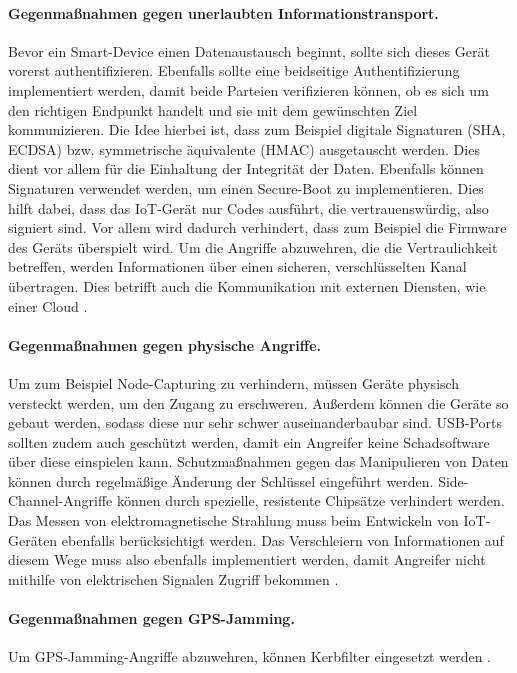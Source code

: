\paragraph{Gegenmaßnahmen gegen unerlaubten Informationstransport.}
Bevor ein Smart-De\-vice einen Datenaustausch beginnt, sollte sich dieses Gerät
vorerst authentifizieren. Ebenfalls sollte eine beidseitige Authentifizierung
implementiert werden, damit beide Parteien verifizieren können, ob es sich um
den richtigen Endpunkt handelt und sie mit dem gewünschten Ziel kommunizieren.
Die Idee hierbei ist, dass zum Beispiel digitale Signaturen (SHA, ECDSA) bzw.
symmetrische äquivalente (HMAC) ausgetauscht werden. Dies dient vor allem für
die Einhaltung der Integrität der Daten. Ebenfalls können Signaturen verwendet
werden, um einen Secure-Boot zu implementieren. Dies hilft dabei, dass das
IoT-Gerät nur Codes ausführt, die vertrauenswürdig, also signiert sind. Vor
allem wird dadurch verhindert, dass zum Beispiel die Firmware des Geräts
überspielt wird. Um die Angriffe abzuwehren, die die Vertraulichkeit betreffen,
werden Informationen über einen sicheren, verschlüsselten Kanal übertragen. Dies
betrifft auch die Kommunikation mit externen Diensten, wie einer Cloud
\cite{paper}.

\paragraph{Gegenmaßnahmen gegen physische Angriffe.}
Um zum Beispiel Node-Capturing zu verhindern, müssen Geräte physisch versteckt
werden, um den Zugang zu erschweren. Außerdem können die Geräte so gebaut
werden, sodass diese nur sehr schwer auseinanderbaubar sind. USB-Ports sollten
zudem auch geschützt werden, damit ein Angreifer keine Schadsoftware über diese
einspielen kann. Schutzmaßnahmen gegen das Manipulieren von Daten können durch
regelmäßige Änderung der Schlüssel eingeführt werden. Side-Channel-Angriffe
können durch spezielle, resistente Chipsätze verhindert werden.  Das Messen von
elektromagnetische Strahlung muss beim Entwickeln von IoT-Geräten ebenfalls
berücksichtigt werden. Das Verschleiern von Informationen auf diesem Wege muss
also ebenfalls implementiert werden, damit Angreifer nicht mithilfe von
elektrischen Signalen Zugriff bekommen \cite{paper}.

\paragraph{Gegenmaßnahmen gegen GPS-Jamming.}
Um GPS-Jamming-Angriffe abzuwehren, können Kerbfilter eingesetzt werden
\cite{paper,borio2012}.

